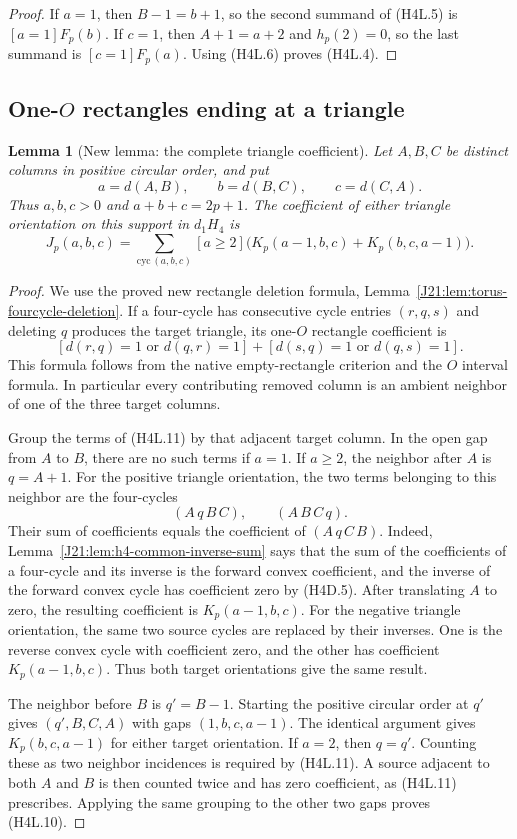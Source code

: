 \documentclass[11pt,oneside]{report}
\newtheorem{lemma}[theorem]{Lemma}
\theoremstyle{definition}
\numberwithin{equation}{section}
\begin{document}
\begin{proof}
If $a=1$, then $B-1=b+1$, so the second summand of (H4L.5) is
$[a=1]F_p(b)$.
If $c=1$, then $A+1=a+2$ and $h_p(2)=0$, so the last summand is
$[c=1]F_p(a)$.
Using (H4L.6) proves (H4L.4).
\end{proof}

\subsection{One-\texorpdfstring{$O$}{O} rectangles ending at a triangle}

\begin{lemma}[New lemma: the complete triangle coefficient]
\label{J21:lem:h4-triangle-coefficient}
Let $A,B,C$ be distinct columns in positive circular order, and put
\[
 a=d(A,B),\qquad b=d(B,C),\qquad c=d(C,A).
\]
Thus $a,b,c>0$ and $a+b+c=2p+1$.
The coefficient of either triangle orientation on this support in
$d_1H_4$ is
\[
 J_p(a,b,c)=
 \sum_{\mathrm{cyc}\,(a,b,c)}
 [a\geq2]\bigl(K_p(a-1,b,c)+K_p(b,c,a-1)\bigr).
 \tag{H4L.10}
\]
\end{lemma}
\begin{proof}
We use the proved new rectangle deletion formula,
Lemma~\ref{J21:lem:torus-fourcycle-deletion}.
If a four-cycle has consecutive cycle entries $(r,q,s)$ and deleting
$q$ produces the target triangle, its one-$O$ rectangle coefficient
is
\[
               [d(r,q)=1\text{ or }d(q,r)=1]
              +[d(s,q)=1\text{ or }d(q,s)=1].
 \tag{H4L.11}
\]
This formula follows from the native empty-rectangle criterion and
the $O$ interval formula. In particular every contributing removed
column is an ambient neighbor of one of the three target columns.

Group the terms of (H4L.11) by that adjacent target column.
In the open gap from $A$ to $B$, there are no such terms if $a=1$.
If $a\geq2$, the neighbor after $A$ is $q=A+1$.
For the positive triangle orientation, the two terms belonging to
this neighbor are the four-cycles
\[
                       (A\,q\,B\,C),\qquad
                       (A\,B\,C\,q).
\]
Their sum of coefficients equals the coefficient of
$(A\,q\,C\,B)$.
Indeed, Lemma~\ref{J21:lem:h4-common-inverse-sum} says that the sum of
the coefficients of a four-cycle and its inverse is the forward
convex coefficient, and the inverse of the forward convex cycle has
coefficient zero by (H4D.5).
After translating $A$ to zero, the resulting coefficient is
$K_p(a-1,b,c)$.
For the negative triangle orientation, the same two source cycles
are replaced by their inverses.
One is the reverse convex cycle with coefficient zero, and the other
has coefficient $K_p(a-1,b,c)$.
Thus both target orientations give the same result.

The neighbor before $B$ is $q'=B-1$.
Starting the positive circular order at $q'$ gives
$(q',B,C,A)$ with gaps $(1,b,c,a-1)$.
The identical argument gives $K_p(b,c,a-1)$ for either target
orientation.
If $a=2$, then $q=q'$.
Counting these as two neighbor incidences is required by
(H4L.11). A source adjacent to both $A$ and $B$ is then counted twice
and has zero coefficient, as (H4L.11) prescribes.
Applying the same grouping to the other two gaps proves (H4L.10).
\end{proof}
\end{document}
